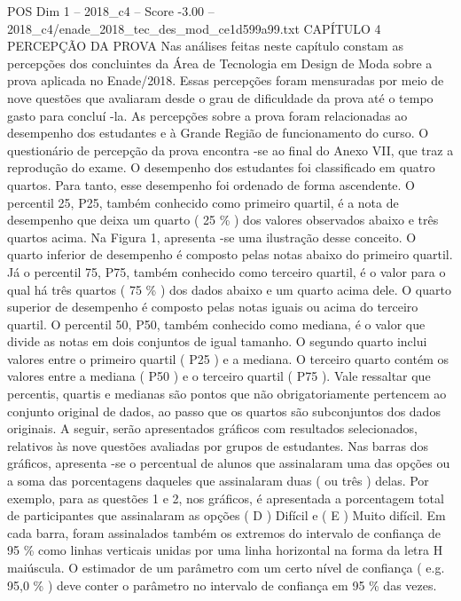 \begin{textsample}{POS Dim 1 – 2018\_c4 – Score -3.00 – 2018\_c4/enade\_2018\_tec\_des\_mod\_ce1d599a99.txt}  \label{ex:f1_pos_306}
CAPÍTULO 4 PERCEPÇÃO DA PROVA Nas análises feitas neste capítulo constam as percepções dos concluintes da Área de Tecnologia em Design de Moda sobre a prova aplicada no Enade/2018.
Essas percepções foram mensuradas por meio de nove questões que avaliaram desde o grau de dificuldade da prova até o tempo gasto para concluí -la.
As percepções sobre a prova foram relacionadas ao desempenho dos estudantes e à Grande Região de funcionamento do curso.
O questionário de percepção da prova encontra -se ao final do Anexo VII, que traz a reprodução do exame.
O desempenho dos estudantes foi classificado em quatro quartos.
Para tanto, esse desempenho foi ordenado de forma ascendente.
O percentil 25, P25, também conhecido como primeiro quartil, é a nota de desempenho que deixa um quarto ( 25 \% ) dos valores observados abaixo e três quartos acima.
Na Figura 1, apresenta -se uma ilustração desse conceito.
O quarto inferior de desempenho é composto pelas notas abaixo do primeiro quartil.
Já o percentil 75, P75, também conhecido como terceiro quartil, é o valor para o qual há três quartos ( 75 \% ) dos dados abaixo e um quarto acima dele.
O quarto superior de desempenho é composto pelas notas iguais ou acima do terceiro quartil.
O percentil 50, P50, também conhecido como mediana, é o valor que divide as notas em dois conjuntos de igual tamanho.
O segundo quarto inclui valores entre o primeiro quartil ( P25 ) e a mediana.
O terceiro quarto contém os valores entre a mediana ( P50 ) e o terceiro quartil ( P75 ).
Vale ressaltar que percentis, quartis e medianas são pontos que não obrigatoriamente pertencem ao conjunto original de dados, ao passo que os quartos são subconjuntos dos dados originais.
A seguir, serão apresentados gráficos com resultados selecionados, relativos às nove questões avaliadas por grupos de estudantes.
Nas barras dos gráficos, apresenta -se o percentual de alunos que assinalaram uma das opções ou a soma das porcentagens daqueles que assinalaram duas ( ou três ) delas.
Por exemplo, para as questões 1 e 2, nos gráficos, é apresentada a porcentagem total de participantes que assinalaram as opções ( D ) Difícil e ( E ) Muito difícil.
Em cada barra, foram assinalados também os extremos do intervalo de confiança de 95 \% como linhas verticais unidas por uma linha horizontal na forma da letra H maiúscula.
O estimador de um parâmetro com um certo nível de confiança ( e.g. 95,0 \% ) deve conter o parâmetro no intervalo de confiança em 95 \% das vezes.

\end{textsample}
